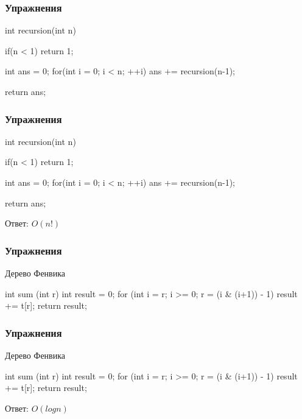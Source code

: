
\begin{frame}[fragile]
    \frametitle{Упражнения}
    
    \begin{cpp}
        int recursion(int n){
            if(n < 1){
                return 1;
            }

            int ans = 0;
            for(int i = 0; i < n; ++i){
                ans += recursion(n-1);
            }

            return ans;
        }
    \end{cpp}
    
\end{frame}


\begin{frame}[fragile]
    \frametitle{Упражнения}
    
    \begin{cpp}
        int recursion(int n){
            if(n < 1){
                return 1;
            }

            int ans = 0;
            for(int i = 0; i < n; ++i){
                ans += recursion(n-1);
            }

            return ans;
        }
    \end{cpp}
    
    Ответ: $O(n!)$
\end{frame}


\begin{frame}[fragile]
    \frametitle{Упражнения}
    
    Дерево Фенвика
    \begin{cpp}
        int sum (int r){
            int result = 0;
            for (int i = r; i >= 0; r = (i & (i+1)) - 1){
                result += t[r];
            }
            return result;
        }
    \end{cpp}
    
\end{frame}


\begin{frame}[fragile]
    \frametitle{Упражнения}
    
    Дерево Фенвика
    \begin{cpp}
        int sum (int r){
            int result = 0;
            for (int i = r; i >= 0; r = (i & (i+1)) - 1){
                result += t[r];
            }
            return result;
        }
    \end{cpp}
    
    Ответ: $O(log{n})$
\end{frame}

